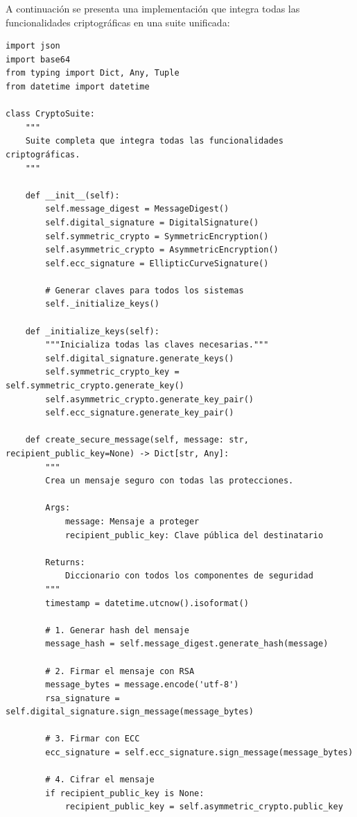\documentclass[12pt,a4paper]{article}
\begin{document}
A continuación se presenta una implementación que integra todas las
funcionalidades criptográficas en una suite unificada:

\begin{lstlisting}[caption=Suite completa de cifrado integrando todas las funcionalidades]
import json
import base64
from typing import Dict, Any, Tuple
from datetime import datetime

class CryptoSuite:
    """
    Suite completa que integra todas las funcionalidades criptográficas.
    """
    
    def __init__(self):
        self.message_digest = MessageDigest()
        self.digital_signature = DigitalSignature()
        self.symmetric_crypto = SymmetricEncryption()
        self.asymmetric_crypto = AsymmetricEncryption()
        self.ecc_signature = EllipticCurveSignature()
        
        # Generar claves para todos los sistemas
        self._initialize_keys()
        
    def _initialize_keys(self):
        """Inicializa todas las claves necesarias."""
        self.digital_signature.generate_keys()
        self.symmetric_crypto_key = self.symmetric_crypto.generate_key()
        self.asymmetric_crypto.generate_key_pair()
        self.ecc_signature.generate_key_pair()
        
    def create_secure_message(self, message: str, recipient_public_key=None) -> Dict[str, Any]:
        """
        Crea un mensaje seguro con todas las protecciones.
        
        Args:
            message: Mensaje a proteger
            recipient_public_key: Clave pública del destinatario
            
        Returns:
            Diccionario con todos los componentes de seguridad
        """
        timestamp = datetime.utcnow().isoformat()
        
        # 1. Generar hash del mensaje
        message_hash = self.message_digest.generate_hash(message)
        
        # 2. Firmar el mensaje con RSA
        message_bytes = message.encode('utf-8')
        rsa_signature = self.digital_signature.sign_message(message_bytes)
        
        # 3. Firmar con ECC
        ecc_signature = self.ecc_signature.sign_message(message_bytes)
        
        # 4. Cifrar el mensaje
        if recipient_public_key is None:
            recipient_public_key = self.asymmetric_crypto.public_key
            

\end{lstlisting}
\end{document}

